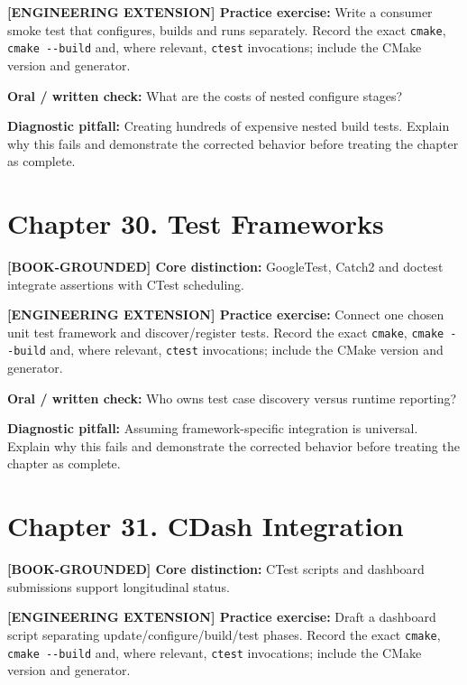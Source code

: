 \documentclass[11pt,letterpaper,oneside]{report}
\providecommand{\passthrough}[1]{#1}
\begin{document}
\textbf{{[}ENGINEERING EXTENSION{]} Practice exercise:} Write a consumer
smoke test that configures, builds and runs separately. Record the exact
\passthrough{\lstinline!cmake!}, \passthrough{\lstinline!cmake --build!}
and, where relevant, \passthrough{\lstinline!ctest!} invocations;
include the CMake version and generator.

\textbf{Oral / written check:} What are the costs of nested configure
stages?

\textbf{Diagnostic pitfall:} Creating hundreds of expensive nested build
tests. Explain why this fails and demonstrate the corrected behavior
before treating the chapter as complete.

\section{Chapter 30. Test Frameworks}\label{chapter-30.-test-frameworks}

\textbf{{[}BOOK-GROUNDED{]} Core distinction:} GoogleTest, Catch2 and
doctest integrate assertions with CTest scheduling.

\textbf{{[}ENGINEERING EXTENSION{]} Practice exercise:} Connect one
chosen unit test framework and discover/register tests. Record the exact
\passthrough{\lstinline!cmake!}, \passthrough{\lstinline!cmake --build!}
and, where relevant, \passthrough{\lstinline!ctest!} invocations;
include the CMake version and generator.

\textbf{Oral / written check:} Who owns test case discovery versus
runtime reporting?

\textbf{Diagnostic pitfall:} Assuming framework-specific integration is
universal. Explain why this fails and demonstrate the corrected behavior
before treating the chapter as complete.

\section{Chapter 31. CDash
Integration}\label{chapter-31.-cdash-integration}

\textbf{{[}BOOK-GROUNDED{]} Core distinction:} CTest scripts and
dashboard submissions support longitudinal status.

\textbf{{[}ENGINEERING EXTENSION{]} Practice exercise:} Draft a
dashboard script separating update/configure/build/test phases. Record
the exact \passthrough{\lstinline!cmake!},
\passthrough{\lstinline!cmake --build!} and, where relevant,
\passthrough{\lstinline!ctest!} invocations; include the CMake version
and generator.
\end{document}
